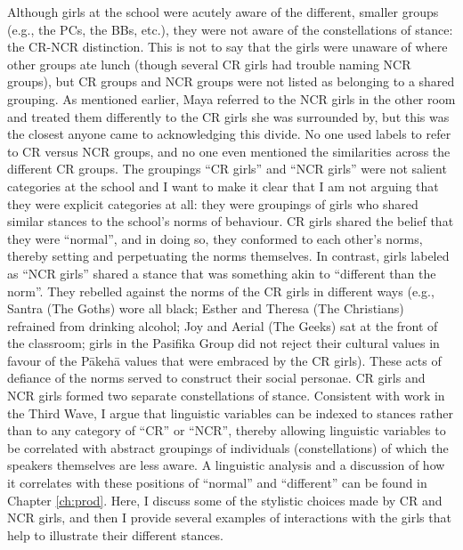 Although girls at the school were acutely aware of the different, smaller groups (e.g., the PCs, the BBs, etc.), they were not aware of the constellations of stance: the CR-NCR distinction.  This is not to say that the girls were unaware of where other groups ate lunch (though several CR girls had trouble naming NCR groups), but CR groups and NCR groups were not listed as belonging to a shared grouping.   As mentioned earlier, Maya referred to the NCR girls in the other room and treated them differently to the CR girls she was surrounded by, but this was the closest anyone came to acknowledging this divide.  No one used labels to refer to CR versus NCR groups, and no one even mentioned the similarities across the different CR groups.  The groupings ``CR girls'' and ``NCR girls'' were not salient categories at the school and I want to make it clear that I am not arguing that they were explicit categories at all: they were groupings of girls who shared similar stances to the school's norms of behaviour.  CR girls shared the belief that they were ``normal'', and in doing so, they conformed to each other's norms, thereby setting and perpetuating the norms themselves.  In contrast, girls labeled as ``NCR girls'' shared a stance that was something akin to ``different than the norm''.  They rebelled against the norms of the CR girls in different ways (e.g., Santra (The Goths) wore all black; Esther and Theresa (The Christians) refrained from drinking alcohol; Joy and Aerial (The Geeks) sat at the front of the classroom; girls in the Pasifika Group did not reject their cultural values in favour of the P\=akeh\=a values that were embraced by the CR girls).  These acts of defiance of the norms served to construct their social personae.  CR girls and NCR girls formed two separate constellations of stance.  Consistent with work in the Third Wave, I argue that linguistic variables can be indexed to stances rather than to any category of ``CR'' or ``NCR'', thereby allowing linguistic variables to be correlated with abstract groupings of individuals (constellations) of which the speakers themselves are less aware.  A linguistic analysis and a discussion of how it correlates with these positions of ``normal'' and ``different'' can be found in Chapter \ref{ch:prod}.  Here, I discuss some of the stylistic choices made by CR and NCR girls, and then I provide several examples of interactions with the girls that help to illustrate their different stances.  

